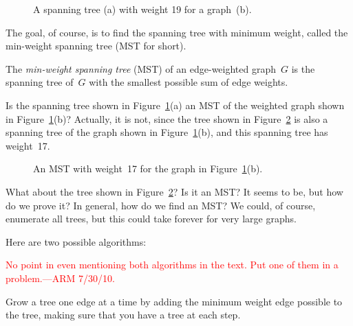 \begin{figure}

%
\qquad
%

\caption{A spanning tree (a) with weight 19 for a graph~(b).}

\label{fig:5KA}

\end{figure}

The goal, of course, is to find the spanning tree with minimum weight,
called the min-weight spanning tree (MST for short).

\begin{definition}
The \emph{min-weight spanning tree} \textup(MST\textup) of an
edge-weighted graph~$G$ is the spanning tree of~$G$ with the smallest
possible sum of edge weights.
\end{definition}

Is the spanning tree shown in Figure~\ref{fig:5KA}(a) an MST of the
weighted graph shown in Figure~\ref{fig:5KA}(b)?  Actually, it is not,
since the tree shown in Figure~\ref{fig:5KB} is also a spanning tree
of the graph shown in Figure~\ref{fig:5KA}(b), and this spanning tree
has weight~17.

\begin{figure}


\caption{An MST with weight~17 for the graph in
  Figure~\ref{fig:5KA}(b).}
\label{fig:5KB}

\end{figure}

What about the tree shown in Figure~\ref{fig:5KB}?  Is it an MST?  It
seems to be, but how do we prove it?  In general, how do we find an
MST\@?  We could, of course, enumerate all trees, but this could take
forever for very large graphs.

Here are two possible algorithms:

\begin{editingnotes}
\textcolor{red}{No point in even mentioning both
 algorithms in the text.  Put one of them in a problem.---ARM 7/30/10.}
\end{editingnotes}

\begin{algorithm}\label{alg:MST1}
  Grow a tree one edge at a time by adding the minimum weight edge
  possible to the tree, making sure that you have a tree at each
  step.
\end{algorithm}

